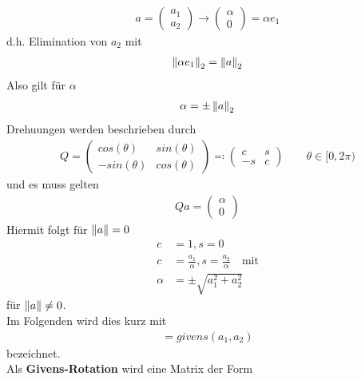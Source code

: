 \begin{gather*}
  a=\begin{pmatrix}a_1 \\ a_2\end{pmatrix} \rightarrow \begin{pmatrix}\alpha \\ 0 \end{pmatrix}
  = \alpha e_1
\end{gather*}
d.h. Elimination von $a_2$ mit
\begin{gather*}
  \left\| \alpha e_1 \right\|_2 = \left\| a \right\|_2
\end{gather*}
Also gilt für $\alpha$
\begin{gather*}
  \alpha=\pm \left\| a \right\|_2
\end{gather*}
Drehuungen werden beschrieben durch
\begin{gather*}
  Q = \begin{pmatrix}
    cos(\theta) & sin(\theta)\\
    -sin(\theta) & cos(\theta)
  \end{pmatrix}
  \eqqcolon \begin{pmatrix}
    c & s\\
    -s & c
  \end{pmatrix}\qquad \theta \in[0,2\pi)
\end{gather*}
und es muss gelten
\begin{gather*}
  Qa = \begin{pmatrix}\alpha \\ 0 \end{pmatrix}
\end{gather*}
Hiermit folgt für $\left\| a \right\|= 0$
\begin{align}
  \nonumber
  c&=1, s=0\\ \nonumber
  c&=\frac{a_1}{\alpha},  s= \frac{a_2}{\alpha}\quad \text{mit}\\
  \alpha & = \pm \sqrt{a_1^2+a_2^2}
           \label{IV.4.4}
\end{align}
für $\left\| a \right\|\neq 0$.\\
Im Folgenden wird dies kurz mit
\begin{gather*}
  [c,s] = givens(a_1, a_2)
\end{gather*}
bezeichnet. \\
Als \textbf{Givens-Rotation} wird eine Matrix der Form
